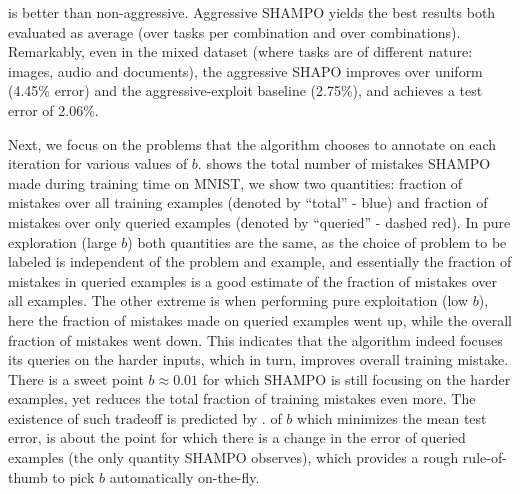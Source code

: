 is better than non-aggressive. Aggressive SHAMPO yields the best results both evaluated as average 
(over tasks per combination and over combinations). Remarkably, even in the mixed dataset 
(where tasks are of different nature: images, audio and documents), the aggressive SHAPO improves over 
uniform (4.45\% error) and the aggressive-exploit baseline (2.75\%), and achieves a test error of 2.06\%.

Next, we focus on the problems that the algorithm chooses to annotate on each iteration for various values 
of $b$.  shows the total number of mistakes SHAMPO made during training time on MNIST, 
we show two quantities: fraction of mistakes over all training examples (denoted by ``total'' - blue) 
and fraction of mistakes over only queried examples (denoted by ``queried'' - dashed red). 
In pure exploration (large %
$b$) both quantities are the same, as the choice of problem to be labeled is independent of the problem and 
example, and essentially the fraction of mistakes in queried examples is a good estimate of the fraction of 
mistakes over all examples. The other extreme is when performing pure exploitation (low %
$b$), here the fraction of mistakes made on queried examples went up, while the overall fraction of mistakes 
went down. This indicates that the algorithm indeed focuses its queries on the harder inputs, which in turn, 
improves overall training mistake. There is a sweet point $b\approx 0.01$ for which SHAMPO is still 
focusing on the harder examples, yet reduces the total fraction of training mistakes even more. 
The existence of such tradeoff is predicted by . %
of $b$ which minimizes the mean test error, is about the point for which there is a change in the error of 
queried examples (the only quantity SHAMPO observes), which provides a rough rule-of-thumb to pick 
$b$ automatically on-the-fly.


